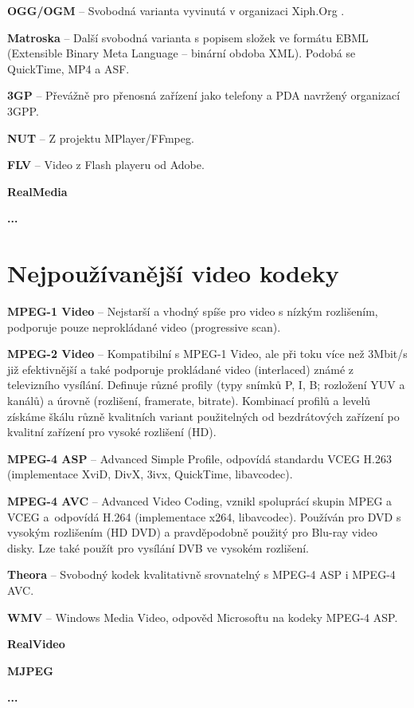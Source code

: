 \item\textbf{OGG/OGM} -- Svobodná varianta vyvinutá v organizaci Xiph.Org \cite{xiphURL}.
\item\textbf{Matroska} -- Další svobodná varianta s popisem složek ve formátu EBML (Extensible Binary Meta Language -- binární obdoba XML). Podobá se QuickTime, MP4 a ASF.
\item\textbf{3GP} -- Převážně pro přenosná zařízení jako telefony a PDA navržený organizací 3GPP.
\item\textbf{NUT} -- Z projektu MPlayer/FFmpeg.
\item\textbf{FLV} -- Video z Flash playeru od Adobe.
\item\textbf{RealMedia}
\item\textbf{...}
\eitem
\section{Nejpoužívanější video kodeky}
\bitem
\item\textbf{MPEG-1 Video} -- Nejstarší a vhodný spíše pro video s nízkým rozlišením, podporuje pouze neprokládané video (progressive scan).
\item\textbf{MPEG-2 Video} -- Kompatibilní s MPEG-1 Video, ale při toku více než 3Mbit/s již efektivnější a také podporuje prokládané video (interlaced) známé z televizního vysílání. Definuje různé profily (typy snímků P, I, B; rozložení YUV a kanálů) a úrovně (rozlišení, framerate, bitrate). Kombinací profilů a levelů získáme škálu různě kvalitních variant použitelných od bezdrátových zařízení po kvalitní zařízení pro vysoké rozlišení (HD).
\item\textbf{MPEG-4 ASP} -- Advanced Simple Profile, odpovídá standardu VCEG H.263 (implementace XviD, DivX, 3ivx, QuickTime, libavcodec).
\item\textbf{MPEG-4 AVC} -- Advanced Video Coding, vznikl spoluprácí skupin MPEG a VCEG a~odpovídá H.264 (implementace x264, libavcodec). Používán pro DVD s vysokým rozlišením (HD DVD) a pravděpodobně použitý pro Blu-ray video disky. Lze také použít pro vysílání DVB ve vysokém rozlišení.
\item\textbf{Theora} -- Svobodný kodek kvalitativně srovnatelný s MPEG-4 ASP i MPEG-4 AVC.
\item\textbf{WMV} -- Windows Media Video, odpověd Microsoftu na kodeky MPEG-4 ASP.
\item\textbf{RealVideo}
\item\textbf{MJPEG}
\item\textbf{...}
\eitem
